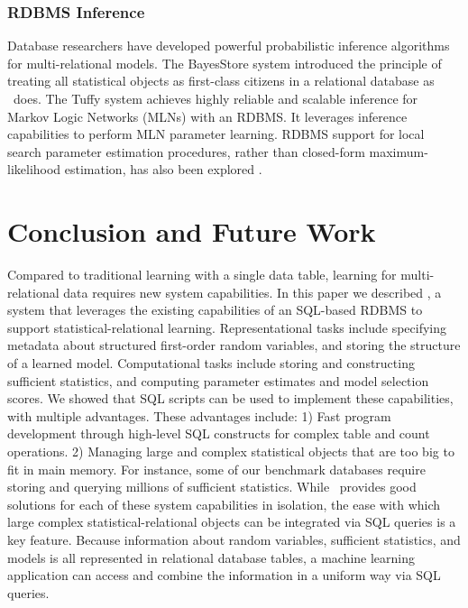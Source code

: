 \documentclass{IEEEtran}
\begin{document}
\subsubsection{RDBMS Inference} 
Database researchers have developed powerful probabilistic inference  algorithms for multi-relational models. 
 The BayesStore system \cite{Wang2008} introduced the principle of treating all statistical objects as first-class citizens in a relational database as \FB\ does. The Tuffy system \cite{Niu2011} achieves highly reliable and scalable inference for Markov Logic Networks (MLNs) with an RDBMS. It leverages inference capabilities to perform MLN parameter learning. RDBMS support for local search parameter estimation procedures, rather than closed-form maximum-likelihood estimation, has also been explored \cite{Feng_SIGMOD_2012,Niu2011,Niu2011a}.


\section{Conclusion and Future Work} 


Compared to traditional learning with a single data table, learning for multi-relational data requires new system capabilities. In this paper we described \FB, a system that leverages the existing capabilities of an SQL-based RDBMS to support statistical-relational learning.
Representational tasks include specifying metadata about structured first-order random variables, and storing the structure of a learned model. Computational tasks include storing and constructing sufficient statistics, and computing parameter estimates and model selection scores. 
We showed that SQL scripts can be used to implement these capabilities, with multiple advantages. These advantages include: 1) Fast program development through high-level SQL constructs for complex table and count operations. 2) Managing large and complex statistical objects that are too big to fit in main memory. 
For instance, some of our benchmark databases require storing and querying millions of sufficient statistics. While \FB\ provides good solutions for each of these system capabilities in isolation, the ease with which large complex statistical-relational objects can be integrated via SQL queries is a key feature. 
Because information about random variables, sufficient statistics, and models 
is all represented in relational database tables,
a machine learning application can access and combine the information in a uniform way via SQL queries.
\end{document}
